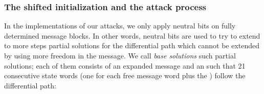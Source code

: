 %
%
%
%

\subsubsection{The shifted initialization and the attack process}
\label{sec:free_att}

In the implementations of our attacks, we only apply neutral bits on fully determined message blocks. In other words, neutral bits are used to try to extend to more steps
partial solutions for the differential path which cannot be extended by using more freedom in the message.
We call \emph{base solutions} such partial solutions; each of them consists of an expanded message and an \iv
such that 21 consecutive state words (one for each free message word plus the \iv) follow the differential path:

